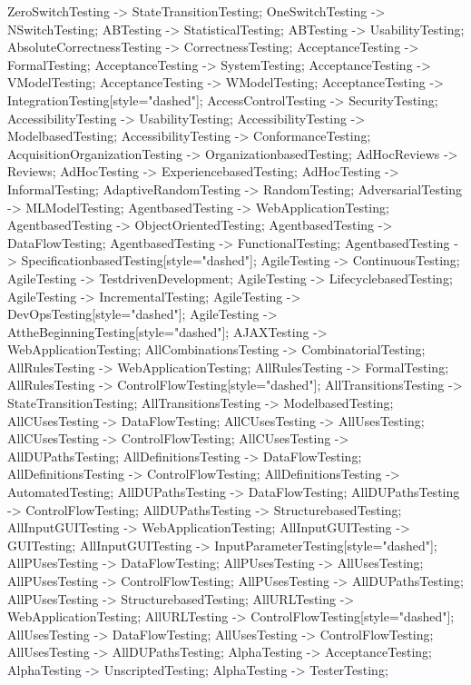 \documentclass{article}
\begin{document}
{ZeroSwitchTesting -> StateTransitionTesting;
OneSwitchTesting -> NSwitchTesting;
ABTesting -> StatisticalTesting;
ABTesting -> UsabilityTesting;
AbsoluteCorrectnessTesting -> CorrectnessTesting;
AcceptanceTesting -> FormalTesting;
AcceptanceTesting -> SystemTesting;
AcceptanceTesting -> VModelTesting;
AcceptanceTesting -> WModelTesting;
AcceptanceTesting -> IntegrationTesting[style="dashed"];
AccessControlTesting -> SecurityTesting;
AccessibilityTesting -> UsabilityTesting;
AccessibilityTesting -> ModelbasedTesting;
AccessibilityTesting -> ConformanceTesting;
AcquisitionOrganizationTesting -> OrganizationbasedTesting;
AdHocReviews -> Reviews;
AdHocTesting -> ExperiencebasedTesting;
AdHocTesting -> InformalTesting;
AdaptiveRandomTesting -> RandomTesting;
AdversarialTesting -> MLModelTesting;
AgentbasedTesting -> WebApplicationTesting;
AgentbasedTesting -> ObjectOrientedTesting;
AgentbasedTesting -> DataFlowTesting;
AgentbasedTesting -> FunctionalTesting;
AgentbasedTesting -> SpecificationbasedTesting[style="dashed"];
AgileTesting -> ContinuousTesting;
AgileTesting -> TestdrivenDevelopment;
AgileTesting -> LifecyclebasedTesting;
AgileTesting -> IncrementalTesting;
AgileTesting -> DevOpsTesting[style="dashed"];
AgileTesting -> AttheBeginningTesting[style="dashed"];
AJAXTesting -> WebApplicationTesting;
AllCombinationsTesting -> CombinatorialTesting;
AllRulesTesting -> WebApplicationTesting;
AllRulesTesting -> FormalTesting;
AllRulesTesting -> ControlFlowTesting[style="dashed"];
AllTransitionsTesting -> StateTransitionTesting;
AllTransitionsTesting -> ModelbasedTesting;
AllCUsesTesting -> DataFlowTesting;
AllCUsesTesting -> AllUsesTesting;
AllCUsesTesting -> ControlFlowTesting;
AllCUsesTesting -> AllDUPathsTesting;
AllDefinitionsTesting -> DataFlowTesting;
AllDefinitionsTesting -> ControlFlowTesting;
AllDefinitionsTesting -> AutomatedTesting;
AllDUPathsTesting -> DataFlowTesting;
AllDUPathsTesting -> ControlFlowTesting;
AllDUPathsTesting -> StructurebasedTesting;
AllInputGUITesting -> WebApplicationTesting;
AllInputGUITesting -> GUITesting;
AllInputGUITesting -> InputParameterTesting[style="dashed"];
AllPUsesTesting -> DataFlowTesting;
AllPUsesTesting -> AllUsesTesting;
AllPUsesTesting -> ControlFlowTesting;
AllPUsesTesting -> AllDUPathsTesting;
AllPUsesTesting -> StructurebasedTesting;
AllURLTesting -> WebApplicationTesting;
AllURLTesting -> ControlFlowTesting[style="dashed"];
AllUsesTesting -> DataFlowTesting;
AllUsesTesting -> ControlFlowTesting;
AllUsesTesting -> AllDUPathsTesting;
AlphaTesting -> AcceptanceTesting;
AlphaTesting -> UnscriptedTesting;
AlphaTesting -> TesterTesting;
}
\end{document}
